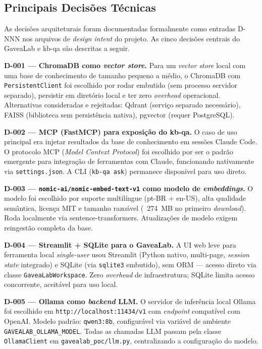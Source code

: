 \documentclass[12pt,a4paper]{article}
\begin{document}
\subsection{Principais Decisões Técnicas}

As decisões arquiteturais foram documentadas formalmente como entradas D-NNN nos
arquivos de \textit{design intent} do projeto. As cinco decisões centrais do GaveaLab e
kb-qa são descritas a seguir.

\textbf{D-001 — ChromaDB como \textit{vector store}.}
Para um \textit{vector store} local com uma base de conhecimento de tamanho pequeno a
médio, o ChromaDB com \texttt{PersistentClient} foi escolhido por rodar embutido (sem
processo servidor separado), persistir em diretório local e ter zero \textit{overhead}
operacional. Alternativas consideradas e rejeitadas: Qdrant (serviço separado necessário),
FAISS (biblioteca sem persistência nativa), pgvector (requer PostgreSQL).

\textbf{D-002 — MCP (FastMCP) para exposição do kb-qa.}
O caso de uso principal era injetar resultados da base de conhecimento em sessões
Claude Code. O protocolo MCP (\textit{Model Context Protocol}) foi escolhido por ser o
padrão emergente para integração de ferramentas com Claude, funcionando nativamente via
\texttt{settings.json}. A CLI (\texttt{kb-qa ask}) permanece disponível para uso direto.

\textbf{D-003 — \texttt{nomic-ai/nomic-embed-text-v1} como modelo de \textit{embeddings}.}
O modelo foi escolhido por suporte multilíngue (pt-BR + en-US), alta qualidade semântica,
licença MIT e tamanho razoável (~274~MB no primeiro \textit{download}). Roda localmente
via sentence-transformers. Atualizações de modelo exigem reingestão completa da base.

\textbf{D-004 — Streamlit + SQLite para o GaveaLab.}
A UI web leve para ferramenta local \textit{single-user} usou Streamlit (Python nativo,
multi-page, \textit{session state} integrado) e SQLite (via \texttt{sqlite3} embutido),
sem ORM — acesso direto via classe \texttt{GaveaLabWorkspace}. Zero \textit{overhead} de
infraestrutura; SQLite limita acesso concorrente, aceitável para uso local.

\textbf{D-005 — Ollama como \textit{backend} LLM.}
O servidor de inferência local Ollama foi escolhido em \texttt{http://localhost:11434/v1}
com \textit{endpoint} compatível com OpenAI. Modelo padrão: \texttt{qwen3:8b}, configurável
via variável de ambiente \texttt{GAVEALAB\_OLLAMA\_MODEL}. Todas as chamadas LLM passam
pela classe \texttt{OllamaClient} em \texttt{gavealab\_poc/llm.py}, centralizando a
configuração do modelo.
\end{document}

